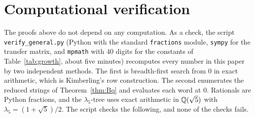 \section{Computational verification}\label{sec:verify}

The proofs above do not depend on any computation. As a check, the script
\texttt{verify\_general.py} (Python with the standard \texttt{fractions} module, \texttt{sympy} for the
transfer matrix, and \texttt{mpmath} with $40$ digits for the constants of Table~\ref{tab:growth}, about
five minutes) recomputes every
number in this paper by two independent methods. The first is breadth-first search from $0$ in exact
arithmetic, which is Kimberling's row construction. The second enumerates the reduced strings of
Theorem~\ref{thm:Bq} and evaluates each word at $0$. Rationals are Python fractions, and the
$\lambda_5$-tree uses exact arithmetic in $\mathbb{Q}(\sqrt5)$ with $\lambda_5=(1+\sqrt5)/2$. The script checks the
following, and none of the checks fails.

